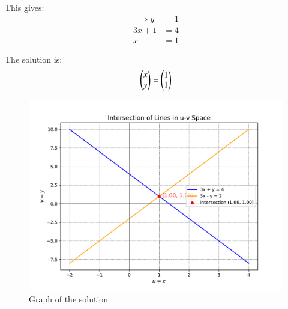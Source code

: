 \documentclass[journal]{IEEEtran}
\begin{document}
This gives:
\begin{align}
      \implies y&=1\\
    3x + 1 &= 4\\
    x &= 1
\end{align}

The solution is:
\begin{align}
    \begin{pmatrix}x\\y\end{pmatrix} = \begin{pmatrix}1 \\ 1\end{pmatrix}
 \end{align}

\begin{figure}[h!]
   \centering
	 \includegraphics[width=\textwidth]{figs/fig.pdf}
   \caption{Graph of the solution}
\end{figure}
\end{document}
